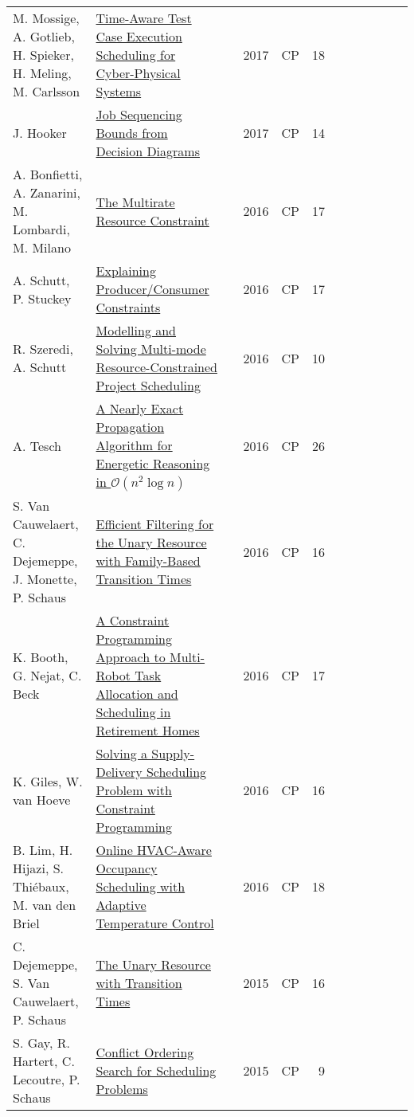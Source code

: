 \documentclass[a4paper]{article}
\begin{document}
{\begin{longtable}{p{3cm}p{6cm}rrcrlcccp{1.5cm}l}
M. Mossige, A. Gotlieb, H. Spieker, H. Meling, M. Carlsson& \href{papers/MossigeGSMC17.pdf}{Time-Aware Test Case Execution Scheduling for Cyber-Physical Systems} & \cite{MossigeGSMC17} & 2017 & CP & 18 & & & & & & \\
J. Hooker & \href{papers/Hooker17.pdf}{Job Sequencing Bounds from Decision Diagrams} & \cite{Hooker17} & 2017 & CP & 14 & & & & & & \\
A. Bonfietti, A. Zanarini, M. Lombardi, M. Milano& \href{papers/BonfiettiZLM16.pdf}{The Multirate Resource Constraint} & \cite{BonfiettiZLM16} & 2016 & CP & 17 & & & & & & \\
A. Schutt, P. Stuckey& \href{papers/SchuttS16.pdf}{Explaining Producer/Consumer Constraints} & \cite{SchuttS16} & 2016 & CP & 17 & & & & & & \\
R. Szeredi, A. Schutt& \href{papers/SzerediS16.pdf}{Modelling and Solving Multi-mode Resource-Constrained Project Scheduling} & \cite{SzerediS16} & 2016 & CP & 10 & & & & & & \\
A. Tesch & \href{papers/Tesch16.pdf}{A Nearly Exact Propagation Algorithm for Energetic Reasoning in $\mathcal O(n^2 \log n)$} & \cite{Tesch16} & 2016 & CP & 26 & & & & & & \\
S. Van Cauwelaert, C. Dejemeppe, J. Monette, P. Schaus& \href{papers/CauwelaertDMS16.pdf}{Efficient Filtering for the Unary Resource with Family-Based Transition Times} & \cite{CauwelaertDMS16} & 2016 & CP & 16 & & & & & & \\
K. Booth, G. Nejat, C. Beck& \href{papers/BoothNB16.pdf}{A Constraint Programming Approach to Multi-Robot Task Allocation and Scheduling in Retirement Homes} & \cite{BoothNB16} & 2016 & CP & 17 & & & & & & \\
K. Giles, W. van Hoeve & \href{papers/GilesH16.pdf}{Solving a Supply-Delivery Scheduling Problem with Constraint Programming} & \cite{GilesH16} & 2016 & CP & 16 & & & & & & \\
B. Lim, H. Hijazi, S. Thi{\'{e}}baux, M. van den Briel& \href{papers/LimHTB16.pdf}{Online HVAC-Aware Occupancy Scheduling with Adaptive Temperature Control} & \cite{LimHTB16} & 2016 & CP & 18 & & & & & & \\
C. Dejemeppe, S. Van Cauwelaert, P. Schaus& \href{papers/DejemeppeCS15.pdf}{The Unary Resource with Transition Times} & \cite{DejemeppeCS15} & 2015 & CP & 16 & & & & & & \\
S. Gay, R. Hartert, C. Lecoutre, P. Schaus& \href{papers/GayHLS15.pdf}{Conflict Ordering Search for Scheduling Problems} & \cite{GayHLS15} & 2015 & CP & 9 & & & & & & \\

\end{longtable}}
\end{document}
